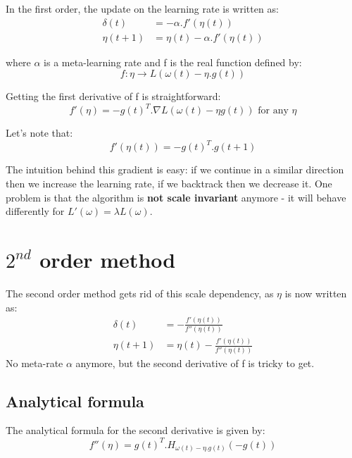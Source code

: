 \documentclass[]{article}
\begin{document}
In the first order, the update on the learning rate is written as:\\
\begin{align}
\delta(t) &= - \alpha.f'(\eta(t))\\
\eta(t+1) &= \eta(t) - \alpha.f'(\eta(t))
\end{align}

where $\alpha$ is a meta-learning rate and f is the real function defined by:\\
$$f: \eta \rightarrow L(\omega(t) - \eta.g(t))$$

Getting the first derivative of f is straightforward:\\
\begin{equation}
f'(\eta) = -g(t)^{T}.\nabla L(\omega(t)-\eta g(t)) \text{ for any $\eta$}
\end{equation}

Let's note that:\\
\begin{equation}
f'(\eta(t)) = -g(t)^{T}.g(t+1)
\end{equation}

The intuition behind this gradient is easy: if we continue in a similar direction then we increase the learning rate, if we backtrack then we decrease it. One problem is that the algorithm is \textbf{not scale invariant} anymore - it will behave differently for $L'(\omega) = \lambda L(\omega)$.

\section{$2^{nd}$ order method}

The second order method gets rid of this scale dependency, as $\eta$ is now written as:\\
\begin{align}
\delta(t) &= - \frac{f'(\eta(t))}{f''(\eta(t))}\\
\eta(t+1) &= \eta(t) - \frac{f'(\eta(t))}{f''(\eta(t))}
\end{align}
No meta-rate $\alpha$ anymore, but the second derivative of f is tricky to get.

\subsection{Analytical formula}

The analytical formula for the second derivative is given by:\\
\begin{equation}
f''(\eta) = g(t)^{T}.H_{\omega(t)-\eta.g(t)}(-g(t))
\end{equation}
\end{document}
